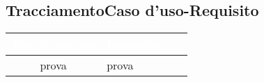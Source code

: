 \subsection{TracciamentoCaso d'uso-Requisito}
{
\renewcommand{\arraystretch}{1.5}
\centering
\begin{longtable}{ c C{4cm} c c}
\textcolor{white}{\textbf{Test di sistema}} & \textcolor{white}{\textbf{Requisito}}\\	
\endhead
prova & prova
\end{longtable}
}






















